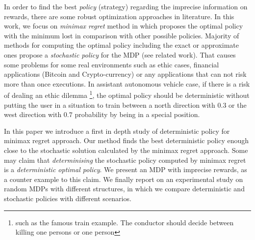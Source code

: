 \documentclass[runningheads,a4paper]{llncs}
\begin{document}
In order to find the best \textit{policy} (strategy) regarding the imprecise information on rewards, there are some robust optimization approaches in literature\cite{Ahmed2017,Iyengar2005,Nilim2003,Xu2009}. In this work, we focus on \textit{minimax regret} method \cite{Regan2009} in which proposes the optimal policy with the minimum lost in comparison with other possible policies. Majority of methods for computing the optimal policy including the exact or approximate ones propose a \textit{stochastic policy} for the MDP (see related work). That causes some problems for some real environments such as ethic cases, financial applications (Bitcoin and Crypto-currency) or any applications that can not risk more than once executions. In assistant autonomous vehicle case, if there is a risk of dealing an ethic dilemma \footnote{such as the famous train example. The conductor should decide between killing one persons or one person}, the optimal policy should be deterministic without putting the user in a situation to train between a north direction with $0.3$ or the west direction with $0.7$ probability by being in a special position.


In this paper we introduce a first in depth study of deterministic policy for minimax regret approach. Our method finds the best deterministic policy enough close to the stochastic solution calculated by the minimax regret approach. Some may claim that \textit{determinising} the stochastic policy computed by minimax regret is a \textit{deterministic optimal policy}. We present an MDP with imprecise rewards, as a counter example to this claim. We finally report on an experimental study on random MDPs with different structures, in which we compare deterministic and stochastic policies with different scenarios. 






\end{document}
